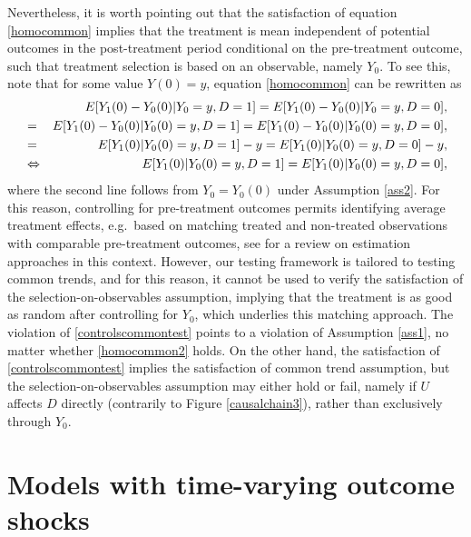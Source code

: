 {	Nevertheless, it is worth pointing out that the satisfaction of equation \eqref{homocommon} implies that the treatment is mean independent of potential outcomes in the post-treatment period conditional on the pre-treatment outcome, such that treatment selection is based on an observable, namely $Y_0$. To see this, note that for some value $Y(0)=y$, equation \eqref{homocommon} can be rewritten as
	\begin{eqnarray}\label{homocommon2}
		&&E[Y_1(0)-Y_0(0)|Y_0=y,D=1]=E[Y_1(0)-Y_0(0)|Y_0=y,D=0],\notag\\
		&=& E[Y_1(0)-Y_0(0)|Y_0(0)=y,D=1]=E[Y_1(0)-Y_0(0)|Y_0(0)=y,D=0],\notag\\
		&=& E[Y_1(0)|Y_0(0)=y,D=1]-y=E[Y_1(0)|Y_0(0)=y,D=0]-y,\notag\\
		&\Leftrightarrow& E[Y_1(0)|Y_0(0)=y,D=1]=E[Y_1(0)|Y_0(0)=y,D=0],
	\end{eqnarray}
	where the second line follows from $Y_0=Y_0(0)$ under Assumption \ref{ass2}. For this reason, controlling for pre-treatment outcomes permits identifying average treatment effects, e.g.\ based on matching treated and non-treated observations with comparable pre-treatment outcomes, see \citet{Im04} for a review on estimation approaches in this context. 	However, our testing framework is tailored to testing common trends, and for this reason, it cannot be used to verify the satisfaction of the selection-on-observables assumption, implying that the treatment is as good as random after controlling for $Y_0$, which underlies this matching approach.  The violation of \eqref{controlscommontest} points to a violation of Assumption \ref{ass1}, no matter whether \eqref{homocommon2} holds. On the other hand, the satisfaction of  \eqref{controlscommontest} implies the satisfaction of common trend assumption, but the selection-on-observables assumption may either hold or fail, namely if $U$ affects $D$ directly (contrarily to Figure \ref{causalchain3}), rather than exclusively through $Y_0$.
	
	\section{Models with time-varying outcome shocks}\label{timevar}
	
}
